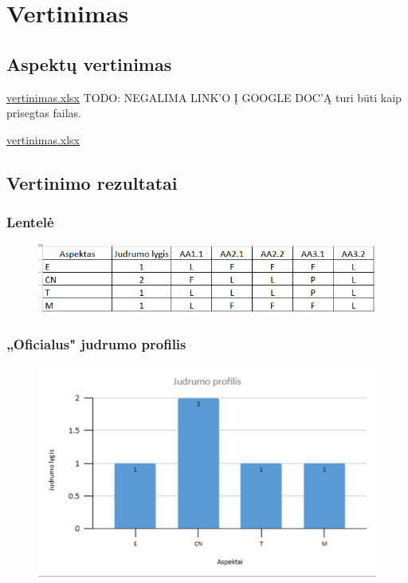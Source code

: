 \documentclass{article}
\begin{document}
\section{Vertinimas}

\subsection{Aspektų vertinimas}

\href{https://docs.google.com/spreadsheets/d/1unX_xcZLEGHqQOMCuBBXYvVhYjChxpnq/edit?usp=share_link&ouid=113452949406463366361&rtpof=true&sd=true}{vertinimas.xlsx} TODO: NEGALIMA LINK'O Į GOOGLE DOC'Ą turi būti kaip prisegtas failas.

\href{../vertinimas.xlsx}{vertinimas.xlsx}

\subsection{Vertinimo rezultatai}

\subsubsection{Lentelė}

\begin{figure}[H]%
    \centering
    \includegraphics[width=0.85\linewidth]{task-2/images/lentele.png}
\end{figure}

\subsubsection{„Oficialus" judrumo profilis}

\begin{figure}[H]%
    \centering
    \includegraphics[width=0.85\linewidth]{task-2/images/judrumo-profilis.png}
\end{figure}
\end{document}
